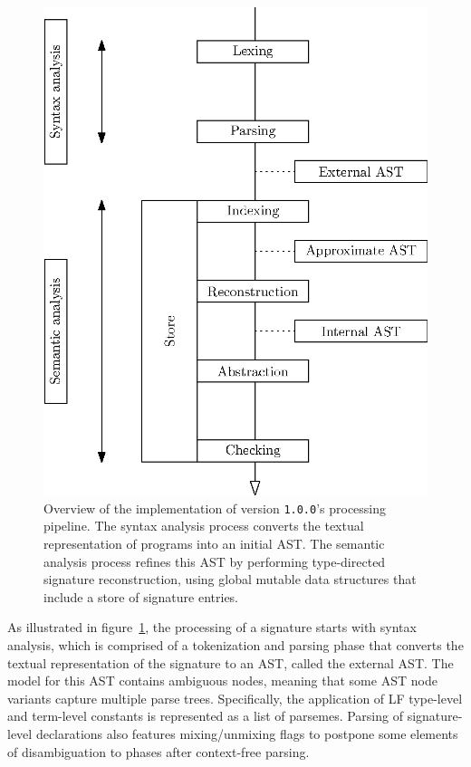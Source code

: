 \begin{figure}
\centering
\includegraphics{figures/legacy-beluga-processing-pipeline.eps}
\caption[Overview of the implementation of \Beluga version \texttt{1.0.0}'s processing pipeline.]{%
Overview of the implementation of \Beluga version \texttt{1.0.0}'s processing pipeline.
The syntax analysis process converts the textual representation of \Beluga programs into an initial \acs{AST}.
The semantic analysis process refines this \acs{AST} by performing type-directed signature reconstruction, using global mutable data structures that include a store of signature entries.
}
\label{figure:legacy-beluga-processing-pipeline}
\end{figure}

As illustrated in figure~\ref{figure:legacy-beluga-processing-pipeline}, the processing of a \Beluga signature starts with syntax analysis, which is comprised of a tokenization and parsing phase that converts the textual representation of the signature to an \ac{AST}, called the external \ac{AST}.
The model for this \ac{AST} contains ambiguous nodes, meaning that some \ac{AST} node variants capture multiple parse trees.
Specifically, the application of \ac{LF} type-level and term-level constants is represented as a list of parsemes.
Parsing of signature-level declarations also features mixing/unmixing flags to postpone some elements of disambiguation to phases after context-free parsing.

